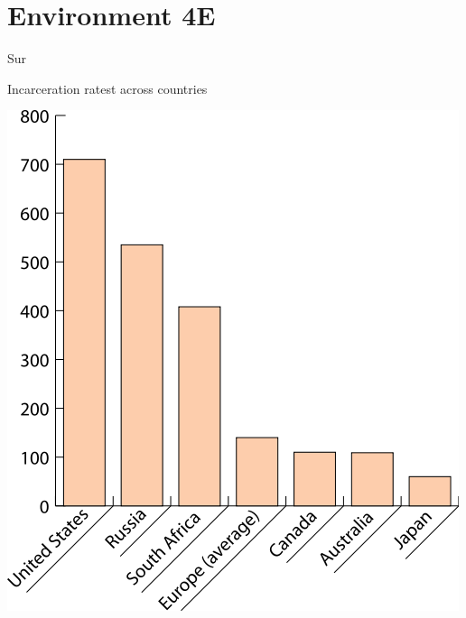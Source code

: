 \section{Environment 4E}

\begin{map}{S}{ur}
\caption{Incarceration ratest across countries}
\label{chart:incarceration}
\includegraphics[width=\chartwidth,height=\chartheight]{incarceration}  
\end{map}

